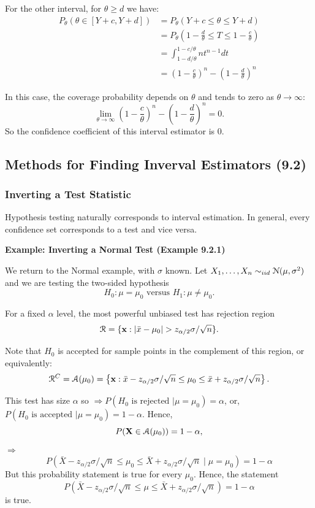 \documentclass[11pt,]{article}
\newcommand{\Xndots}{X_1, \ldots, X_n}
\def\bx{{\bf x}}
\def\bX{{\bf X}}
\def\xbar{\bar{ x}}
\def\Xbar{\bar{ X}}
\def\Asc{{\cal A}}
\def\Nsc{{\cal N}}
\def\Rsc{{\cal R}}
\begin{document}
For the other interval, for \(\theta\geq d\) we have: \begin{align*}
P_\theta( \theta \in [Y+c, Y+d]) &= P_\theta(Y+c \leq \theta \leq Y+d)\\
&=P_\theta\left(1-\frac{d}{\theta} \leq T \leq 1 - \frac{c}{\theta}\right)\\ 
&= \int_{1-d/\theta}^{1-c/\theta} nt^{n-1}dt\\
&= \left(1-\frac{c}{\theta}\right)^n -  \left(1-\frac{d}{\theta}\right)^n
\end{align*}

In this case, the coverage probability depends on \(\theta\) and tends
to zero as \(\theta \to \infty\):
\[\lim_{\theta \rightarrow \infty} \left(1-\frac{c}{\theta}\right)^n -  \left(1-\frac{d}{\theta}\right)^n = 0.\]
So the confidence coefficient of this interval estimator is 0.

\subsection{Methods for Finding Inverval Estimators (9.2)}

\subsubsection{Inverting a Test Statistic}

Hypothesis testing naturally corresponds to interval estimation. In
general, every confidence set corresponds to a test and vice versa.

\noindent \textbf{Example: Inverting a Normal Test (Example 9.2.1)}

We return to the Normal example, with \(\sigma\) known. Let
\(\Xndots \sim_{iid} \Nsc(\mu,\sigma^2)\) and we are testing the
two-sided hypothesis
\[H_0: \mu = \mu_0 \mbox{ versus } H_1: \mu \neq \mu_0.\]

For a fixed \(\alpha\) level, the most powerful unbiased test has
rejection region
\[\Rsc = \{\bx: |\xbar - \mu_0| > z_{\alpha/2}\sigma/\sqrt{n}\}.\]

Note that \(H_0\) is accepted for sample points in the complement of
this region, or equivalently:
\[\Rsc^C = \Asc(\mu_0) = \left\{\bx: \xbar - z_{\alpha/2}\sigma/\sqrt{n} \leq \mu_0 \leq \xbar + z_{\alpha/2}\sigma/\sqrt{n}\right\}.\]

This test has size \(\alpha\) so
\(\Rightarrow P\left(H_0 \mbox{ is rejected } | \mu = \mu_0\right) = \alpha\),
or, \(P(H_0 \mbox{ is accepted } | \mu = \mu_0) = 1 - \alpha\). Hence,
\[P(\bX \in \Asc(\mu_0)) = 1-\alpha,\] \(\Rightarrow\)
\[P\left(\Xbar - z_{\alpha/2}\sigma/\sqrt{n} \leq \mu_0 \leq \Xbar + z_{\alpha/2}\sigma/\sqrt{n} \mid \mu  = \mu_0\right) = 1 - \alpha\]
But this probability statement is true for every \(\mu_0\). Hence, the
statement
\[P\left(\Xbar - z_{\alpha/2}\sigma/\sqrt{n} \leq \mu \leq \Xbar + z_{\alpha/2}\sigma/\sqrt{n} \right) = 1 - \alpha\]
is true.
\end{document}
